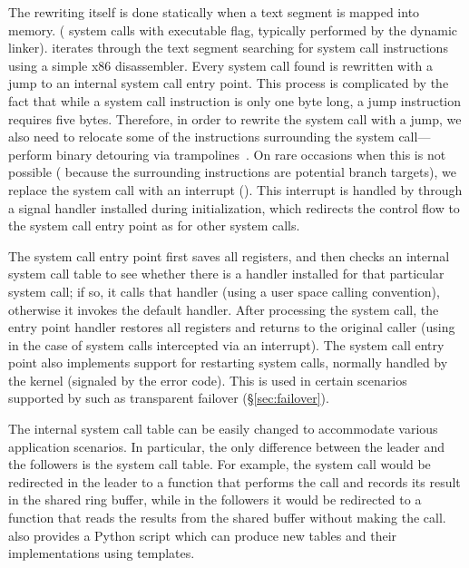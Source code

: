 The rewriting itself is done statically when a text segment is mapped into
memory.  (\ie {} system calls with executable flag, typically performed
by the dynamic linker).  \vx iterates through the text segment searching for
system call instructions using a simple x86 disassembler. Every system call
found is rewritten with a jump to an internal system call entry point. This
process is complicated by the fact that while a system call instruction is only
one byte long, a jump instruction requires five bytes. Therefore, in order to
rewrite the system call with a jump, we also need to relocate some of the
instructions surrounding the system call---\ie perform binary detouring via
trampolines~\cite{detours}.  On rare occasions when this is not possible (\eg
because the surrounding instructions are potential branch targets), we replace
the system call with an interrupt ().  This interrupt is handled
by \vx through a signal handler installed during initialization, which
redirects the control flow to the system call entry point as for other system
calls.

The system call entry point first saves all registers, and then checks an
internal system call table to see whether there is a handler installed for that
particular system call; if so, it calls that handler (using a user space
calling convention), otherwise it invokes the default handler.  After
processing the system call, the entry point handler restores all registers and
returns to the original caller (using  in the case of system
calls intercepted via an interrupt). The system call entry point also
implements support for restarting system calls, normally handled by the kernel
(\ie signaled by the  error code). This is used in certain
scenarios supported by \vx such as transparent failover (\S\ref{sec:failover}).

The internal system call table can be easily changed to accommodate
various application scenarios.  In particular, the only difference
between the leader and the followers is the system call table. For
example, the  system call would be redirected in the leader
to a function that performs the call and records its result in the
shared ring buffer, while in the followers it would be redirected to a
function that reads the results from the shared buffer without making
the call.
\varan  also provides a Python script which can produce new tables
and their implementations using templates.


